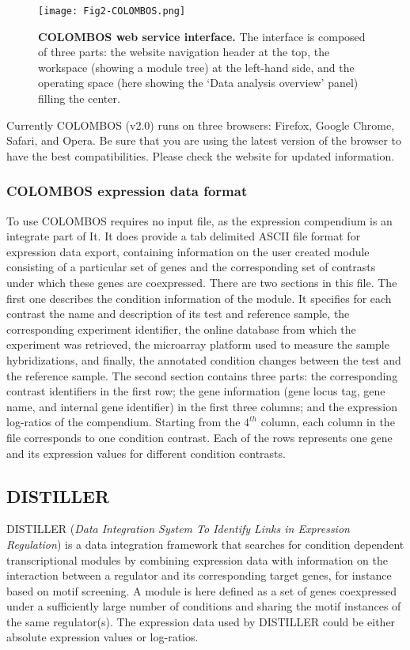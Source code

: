 \begin{figure}[tb]
	\centering
  	\texttt{[image: Fig2-COLOMBOS.png]}
	\caption[COLOMBOS web service interface]{\textbf{COLOMBOS web 
	service interface.} 
	The interface is composed of three parts: the website navigation header at 
	the top, the workspace (showing a module tree) at the left-hand side, and 
	the operating space (here showing the `Data analysis overview' panel) 
	filling the center.}
	\label{fig:colombos}
\end{figure}

Currently COLOMBOS (v2.0) runs on three browsers: Firefox, Google Chrome, Safari, and Opera. Be sure that you are using the latest version of the browser to have the best compatibilities. Please check the website for updated information.

\subsubsection{COLOMBOS expression data format}\label{sec:dist-format-col}
To use COLOMBOS requires no input file, as the expression compendium is an integrate part of It.   It does provide a tab delimited ASCII file format for expression data export, containing information on the user created module consisting of a particular set of genes and the corresponding set of contrasts under which these genes are coexpressed. There are two sections in this file. The first one describes the condition information of the module. It specifies for each contrast the name and description of its test and reference sample, the corresponding experiment identifier, the online database from which the experiment was retrieved, the microarray platform used to measure the sample hybridizations, and finally, the annotated condition changes between the test and the reference sample. The second section contains three parts: the corresponding contrast identifiers in the first row; the gene information (gene locus tag, gene name, and internal gene identifier) in the first three columns; and the expression log-ratios of the compendium. Starting from the $4^{th}$ column, each column in the file corresponds to one condition contrast. Each of the rows represents one gene and its expression values for different condition contrasts. 

\subsection{DISTILLER}\label{sec:dist-distiller}
DISTILLER (\textit{Data Integration System To Identify Links in Expression   Regulation}) is a data integration framework that searches for condition dependent transcriptional modules by combining expression data with information on the interaction between a regulator and its corresponding target genes, for instance based on motif screening. A module is here defined as a set of genes coexpressed under a sufficiently large number of conditions and sharing the motif instances of the same regulator(s).  The expression data used by DISTILLER could be either absolute expression values or log-ratios.

